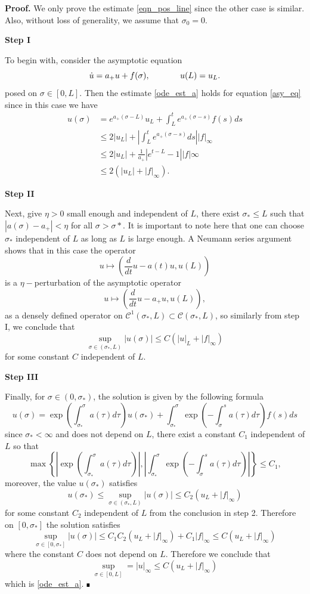 \documentclass[letterpaper,11pt]{article}
\numberwithin{equation}{section}
\theoremstyle{plain}
\newenvironment{Proof}[1][.]%
 {\begin{trivlist}\item[]\textbf{Proof#1 }}%
 {\hspace*{\fill}$\rule{0.3\baselineskip}{0.35\baselineskip}$\end{trivlist}}
\begin{document}
\begin{Proof}
We only prove the estimate \eqref{eqn_pos_line} since the other case is similar. Also, without loss of generality, we assume that $\sigma_0 = 0$.

\textbf{Step I}

To begin with, consider the asymptotic equation 
\begin{equation}\label{asy_eq}
\dot{u} = a_+ u + f(\sigma),\hspace{ 0.5in } u(L) = u_L.
\end{equation}
posed on $\sigma \in [0, L]$.
Then the estimate \eqref{ode_est_a} holds for equation \eqref{asy_eq} since in this case we have
\begin{align*}
u(\sigma) &= e^{a_+(\sigma-L)}u_L + \int_L^t e^{a_+(\sigma-s)} f(s)ds \\ 
&\le 2|u_L| + \left|\int_L^t e^{a_+(\sigma-s)}ds \right| |f|_\infty\\ 
&\le  2|u_L|+\frac{1}{a_+} \left|e^{t-L}-1\right||f|\infty\\
& \le 2(|u_L|+|f|_\infty ).
\end{align*}

\textbf{Step II}

Next, give $\eta>0$ small enough and independent of $L$, there exist $\sigma_* \le L$ such that $|a(\sigma)- a_+|< \eta$ for all $\sigma>\sigma*$. It is important to note here that one can choose $\sigma_*$ independent of $L$ as long as $L$ is large enough. A Neumann series argument shows that in this case the operator 
\[ u \mapsto
 \left(\frac{d}{dt}u-a(t)u, u(L)\right)
\] is a $\eta-$perturbation of the asymptotic operator
\[ u \mapsto
 \left(\frac{d}{dt}u-a_+u, u(L)\right),
\]
as a densely defined operator on $\mathcal{C}^1(\sigma_*,L) \subset \mathcal{C}(\sigma_*,L)$, so similarly from step I, we conclude that 
\[
\sup_{\sigma \in (\sigma_*,L)} |u(\sigma)| \le C(|u|_L + |f|_\infty)
\]
for some constant $C$ independent of $L$.

\textbf{Step III}

Finally, for $\sigma \in (0,\sigma_*)$, the solution is given by the following formula
\[
u(\sigma) = \exp\left(\int^{\sigma}_{\sigma_*} a(\tau)d\tau\right) u(\sigma_*) + \int_{\sigma_*}^{\sigma} \exp\left(-\int_{\sigma}^{s}a(\tau)d\tau\right)f(s)ds 
\]
since $\sigma_*< \infty$ and does not depend on $L$, there exist a constant $C_1$ independent of $L$ so that 
\[
\max\left\{ \left|\exp\left(\int^{\sigma}_{\sigma_*} a(\tau)d\tau\right)\right|, \left| \int_{\sigma_*}^{\sigma} \exp\left(-\int_{\sigma}^{s}a(\tau)d\tau\right)\right| \right\} \le C_1,
\]
moreover, the value $u(\sigma_*)$ satisfies
\[
u(\sigma_*) \le \sup_{\sigma \in (\sigma_*,L)} |u(\sigma)| \le C_2(u_L + |f|_\infty)
\]
for some constant $C_2$ independent of $L$ from the conclusion in step 2.
Therefore on $[0,\sigma_*]$ the solution satisfies
\[
\sup_{\sigma \in [0,\sigma_*]}|u(\sigma)| \le C_1C_2(u_L+|f|_\infty) +C_1|f|_\infty \le C(u_L+|f|_\infty)
\]
where the constant $C$ does not depend on $L$. Therefore we conclude that
\[
\sup_{\sigma \in [0,L]} = |u|_\infty \le C(u_L+|f|_\infty)
\]
which is \eqref{ode_est_a}.
\nocite{*}
\end{Proof}





\end{document}
